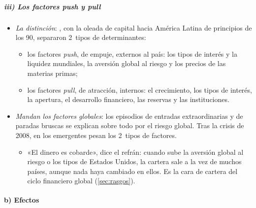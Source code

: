 \documentclass[11pt]{article}
\begin{document}
\subparagraph{iii) Los factores \emph{push} y \emph{pull}}

\begin{itemize}
\item \emph{La distinción}: \textcite{CalvoLeidermanReinhart1993}, con la oleada de capital hacia América Latina de principios de los 90, separaron 2~tipos de determinantes:
  \begin{itemize}
  \item los factores \emph{push}, de empuje, externos al país: los tipos de interés y la liquidez mundiales, la aversión global al riesgo y los precios de las materias primas;
  \item los factores \emph{pull}, de atracción, internos: el crecimiento, los tipos de interés, la apertura, el desarrollo financiero, las reservas y las instituciones.
  \end{itemize}
\item \emph{Mandan los factores globales}: los episodios de entradas extraordinarias y de paradas bruscas se explican sobre todo por el riesgo global\nocite{ForbesWarnock2012}. Tras la crisis de 2008, en los emergentes pesan los 2~tipos de factores\nocite{Hannan2017Drivers}.
  \begin{itemize}
  \item «El dinero es cobarde», dice el refrán: cuando sube la aversión global al riesgo o los tipos de Estados Unidos, la cartera sale a la vez de muchos países, aunque nada haya cambiado en ellos. Es la cara de cartera del ciclo financiero global (\ref{sec:rasgos}).
  \end{itemize}
\end{itemize}

\paragraph{b) Efectos}
\end{document}
